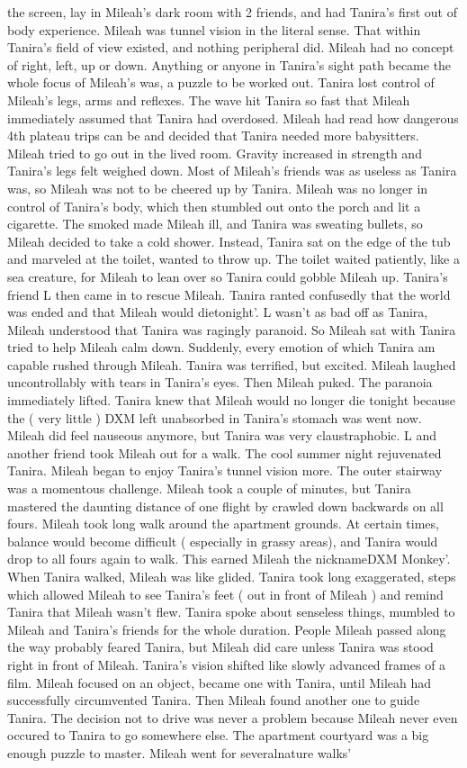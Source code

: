 \documentclass[12pt]{book}
\begin{document}
the screen, lay in Mileah's dark room with 2 friends, and had Tanira's first out of body experience. Mileah was tunnel vision in the literal sense. That within Tanira's field of view existed, and nothing peripheral did. Mileah had no concept of right, left, up or down. Anything or anyone in Tanira's sight path became the whole focus of Mileah's was, a puzzle to be worked out. Tanira lost control of Mileah's legs, arms and reflexes. The wave hit Tanira so fast that Mileah immediately assumed that Tanira had overdosed. Mileah had read how dangerous 4th plateau trips can be and decided that Tanira needed more babysitters. Mileah tried to go out in the lived room. Gravity increased in strength and Tanira's legs felt weighed down. Most of Mileah's friends was as useless as Tanira was, so Mileah was not to be cheered up by Tanira. Mileah was no longer in control of Tanira's body, which then stumbled out onto the porch and lit a cigarette. The smoked made Mileah ill, and Tanira was sweating bullets, so Mileah decided to take a cold shower. Instead, Tanira sat on the edge of the tub and marveled at the toilet, wanted to throw up. The toilet waited patiently, like a sea creature, for Mileah to lean over so Tanira could gobble Mileah up. Tanira's friend L then came in to rescue Mileah. Tanira ranted confusedly that the world was ended and that Mileah would dietonight'. L wasn't as bad off as Tanira, Mileah understood that Tanira was ragingly paranoid. So Mileah sat with Tanira tried to help Mileah calm down. Suddenly, every emotion of which Tanira am capable rushed through Mileah. Tanira was terrified, but excited. Mileah laughed uncontrollably with tears in Tanira's eyes. Then Mileah puked. The paranoia immediately lifted. Tanira knew that Mileah would no longer die tonight because the ( very little ) DXM left unabsorbed in Tanira's stomach was went now. Mileah did feel nauseous anymore, but Tanira was very claustraphobic. L and another friend took Mileah out for a walk. The cool summer night rejuvenated Tanira. Mileah began to enjoy Tanira's tunnel vision more. The outer stairway was a momentous challenge. Mileah took a couple of minutes, but Tanira mastered the daunting distance of one flight by crawled down backwards on all fours. Mileah took long walk around the apartment grounds. At certain times, balance would become difficult ( especially in grassy areas), and Tanira would drop to all fours again to walk. This earned Mileah the nicknameDXM Monkey'. When Tanira walked, Mileah was like glided. Tanira took long exaggerated, steps which allowed Mileah to see Tanira's feet ( out in front of Mileah ) and remind Tanira that Mileah wasn't flew. Tanira spoke about senseless things, mumbled to Mileah and Tanira's friends for the whole duration. People Mileah passed along the way probably feared Tanira, but Mileah did care unless Tanira was stood right in front of Mileah. Tanira's vision shifted like slowly advanced frames of a film. Mileah focused on an object, became one with Tanira, until Mileah had successfully circumvented Tanira. Then Mileah found another one to guide Tanira. The decision not to drive was never a problem because Mileah never even occured to Tanira to go somewhere else. The apartment courtyard was a big enough puzzle to master. Mileah went for severalnature walks' 
\end{document}
